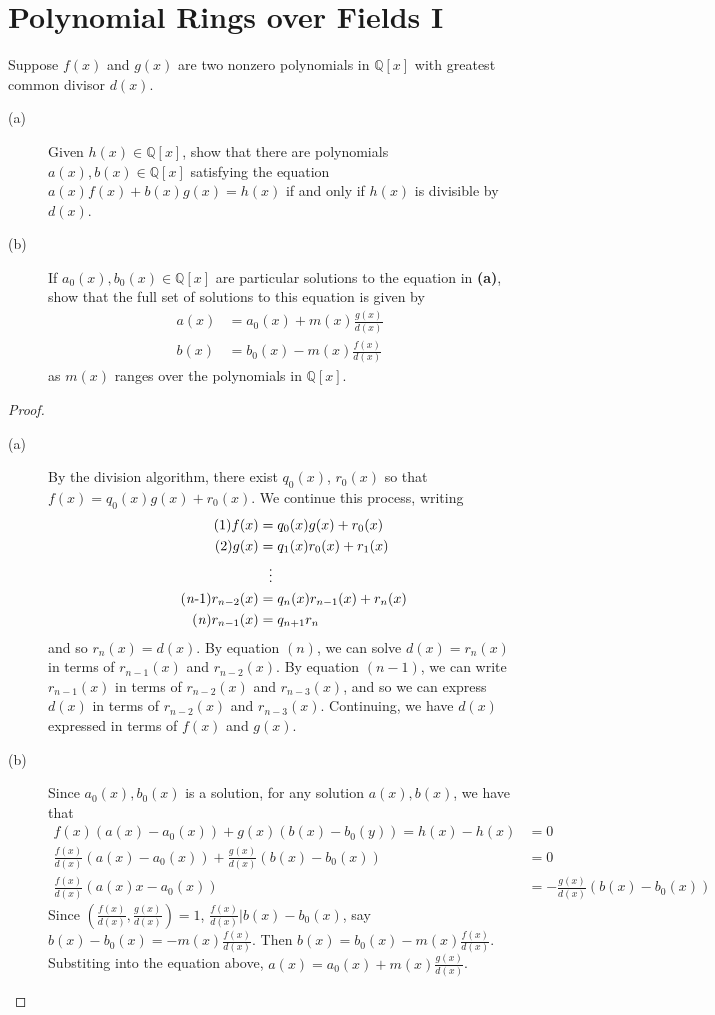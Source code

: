 \documentclass[12pt,leqno]{book}
\numberwithin{equation}{section}
\newcommand{\question}[2] {\vspace{.25in}\noindent\fbox{#1} #2 \vspace{.10in}}
\theoremstyle{definition}
\begin{document}
\section{Polynomial Rings over Fields I}
\question{11}{Suppose $f(x)$ and $g(x)$ are two nonzero polynomials in $\mathbb{Q}[x]$ with greatest common divisor $d(x)$.}
\begin{description}
 \item [(a)] Given $h(x)\in\mathbb{Q}[x]$, show that there are polynomials $a(x),b(x)\in\mathbb{Q}[x]$ satisfying the equation $a(x)f(x)+b(x)g(x)=h(x)$ if and only if $h(x)$ is divisible by $d(x)$.
 \item [(b)] If $a_0(x),b_0(x)\in\mathbb{Q}[x]$ are particular solutions to the equation in \textbf{(a)}, show that the full set of solutions to this equation is given by\begin{align*}a(x)&=a_0(x)+m(x)\frac{g(x)}{d(x)}\\b(x)&=b_0(x)-m(x)\frac{f(x)}{d(x)}\end{align*} as $m(x)$ ranges over the polynomials in $\mathbb{Q}[x]$.  
\end{description}

\begin{proof}\indent
\begin{description}
 \item [(a)] By the division algorithm, there exist $q_0(x)$, $r_0(x)$ so that $f(x)=q_0(x)g(x)+r_0(x)$. We continue this process, writing \begin{align*}\tag{1}f(x)&=q_0(x)g(x)+r_0(x)\\\tag{2}g(x)&=q_1(x)r_0(x)+r_1(x)\\&\hskip.1in\vdots\\\tag{\textit{n}-1}r_{n-2}(x)&=q_n(x)r_{n-1}(x)+r_n(x)\\\tag{\textit{n}}r_{n-1}(x)&=q_{n+1}r_n\end{align*} and so $r_n(x)=d(x)$. By equation $(n)$, we can solve $d(x)=r_n(x)$ in terms of $r_{n-1}(x)$ and $r_{n-2}(x)$. By equation $(n-1)$, we can write $r_{n-1}(x)$ in terms of $r_{n-2}(x)$ and $r_{n-3}(x)$, and so we can express $d(x)$ in terms of $r_{n-2}(x)$ and $r_{n-3}(x)$. Continuing, we have $d(x)$ expressed in terms of $f(x)$ and $g(x)$.
 \item [(b)] Since $a_0(x),b_0(x)$ is a solution, for any solution $a(x),b(x)$, we have that \begin{align*}f(x)\left(a(x)-a_0(x)\right)+g(x)\left(b(x)-b_0(y)\right)=h(x)-h(x)&=0\\\frac{f(x)}{d(x)}\left(a(x)-a_0(x)\right)+\frac{g(x)}{d(x)}\left(b(x)-b_0(x)\right)&=0\\\frac{f(x)}{d(x)}\left(a(x)x-a_0(x)\right)&=-\frac{g(x)}{d(x)}\left(b(x)-b_0(x)\right)\end{align*} Since $\left(\frac{f(x)}{d(x)},\frac{g(x)}{d(x)}\right)=1$, $\frac{f(x)}{d(x)}|b(x)-b_0(x)$, say $b(x)-b_0(x)=-m(x)\frac{f(x)}{d(x)}$. Then $b(x)=b_0(x)-m(x)\frac{f(x)}{d(x)}$. Substiting into the equation above, $a(x)=a_0(x)+m(x)\frac{g(x)}{d(x)}$.\qedhere
\end{description}
\end{proof}
\end{document}
